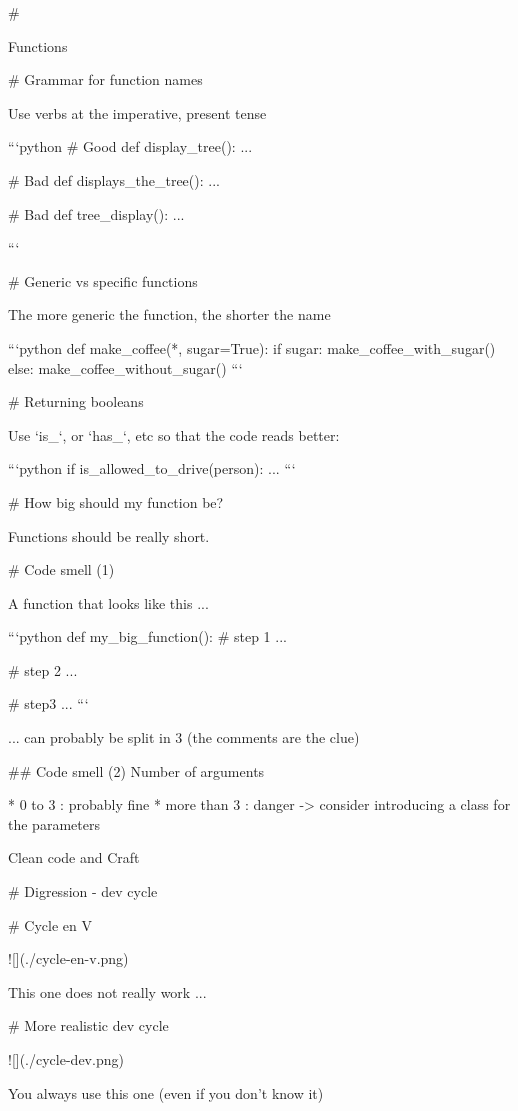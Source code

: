 #

\huge \center Functions


# Grammar for function names

Use verbs at the imperative, present tense

```python
# Good
def display_tree():
    ...

# Bad
def displays_the_tree():
    ...

# Bad
def tree_display():
    ...

```

# Generic vs specific functions

The more generic the function, the shorter the name

```python
def make_coffee(*, sugar=True):
    if sugar:
        make_coffee_with_sugar()
   else:
        make_coffee_without_sugar()
```



# Returning booleans

Use `is_`, or `has_`, etc so that the code reads better:

```python
if is_allowed_to_drive(person):
    ...
```

# How big should my function be?

Functions should be really short.

# Code smell (1)

A function that looks like this ...

```python
def my_big_function():
    # step 1
    ...

    # step 2
    ...

    # step3
    ...
```

... can probably be split in 3 (the comments are the clue)

## Code smell (2)  Number of arguments

* 0 to 3 : probably fine
* more than 3 : danger -> consider introducing
  a class for the parameters

\huge \center Clean code and Craft

# Digression - dev cycle

# Cycle en V

![](./cycle-en-v.png)

This one does not really work ...

# More realistic dev cycle

![](./cycle-dev.png)

\vfill

You always use this one (even if you don't know it)

